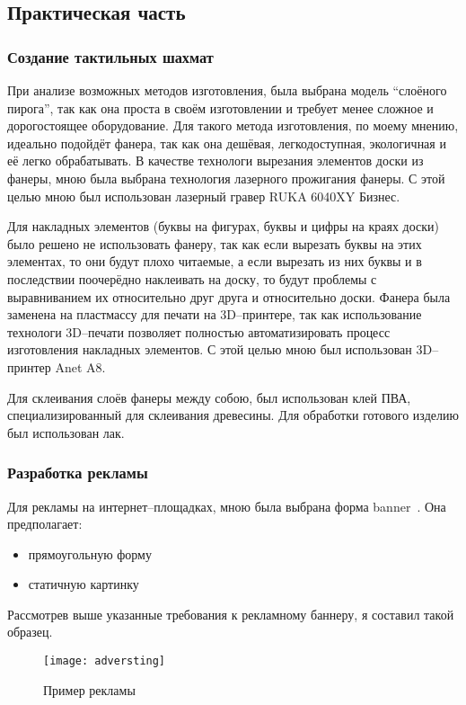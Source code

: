 \newpage
\subsection{Практическая часть}
\subsubsection{Создание тактильных шахмат}
При анализе возможных методов изготовления, была выбрана модель ``слоёного
пирога'', так как она проста в своём изготовлении и требует менее сложное и
дорогостоящее оборудование. Для такого метода изготовления, по моему мнению,
идеально подойдёт фанера, так как она дешёвая, легкодоступная, экологичная и её
легко обрабатывать. В качестве технологи вырезания элементов доски из фанеры,
мною была выбрана технология лазерного прожигания фанеры. С этой целью мною был
использован лазерный гравер RUKA 6040XY Бизнес.

Для накладных элементов (буквы на фигурах, буквы и цифры на краях доски) было
решено не использовать фанеру, так как если вырезать буквы на этих элементах,
то они будут плохо читаемые, а если вырезать из них буквы и в последствии
поочерёдно наклеивать на доску, то будут проблемы с выравниванием их
относительно друг друга и относительно доски. Фанера была заменена на
пластмассу для печати на 3D--принтере, так как использование технологи
3D--печати позволяет полностью автоматизировать процесс изготовления накладных
элементов. С этой целью мною был использован 3D--принтер Anet A8.

Для склеивания слоёв фанеры между собою, был использован клей ПВА,
специализированный для склеивания древесины. Для обработки готового изделию был
использован лак. 

\subsubsection{Разработка рекламы}
Для рекламы на интернет--площадках, мною была выбрана форма
\gls{banner}~\cite{web:wiki-banner}. Она предполагает:
\begin{itemize}
    \item прямоугольную форму
    \item статичную картинку
\end{itemize}

Рассмотрев выше указанные требования к рекламному баннеру, я составил такой образец.

\begin{figure}[H]
    \centering
    \texttt{[image: adversting]}
    \caption{Пример рекламы}\label{fig:adversting}
\end{figure}
\newpage
